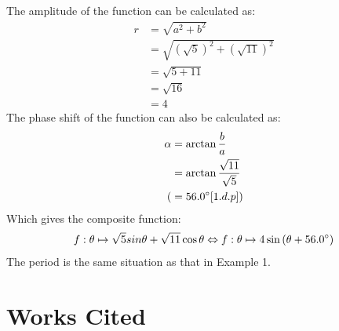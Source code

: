 \documentclass{article}
\begin{document}
        The amplitude of the function can be calculated as:
        \begin{align*}
        r &= \sqrt{a^2 + b^2} \\
        &= \sqrt{(\sqrt{5})^2 + (\sqrt{11})^2} \\
        &= \sqrt{5 + 11} \\
        &= \sqrt{16} \\
        &= 4
        \end{align*}
        The phase shift of the function can also be calculated as:
        \begin{align*}
        \alpha &= \arctan{\frac{b}{a}} \\
        &= \arctan{\frac{\sqrt{11}}{\sqrt{5}}} \\
        (&= 56.0\degree [1.d.p]) 
        \end{align*}
        Which gives the composite function:
        \begin{align*}
        f:\theta \mapsto \sqrt{5}sin{\theta} + \sqrt{11}\cos{\theta} \Leftrightarrow f:\theta \mapsto 4\sin{(\theta + 56.0\degree)}
        \end{align*}
        The period is the same situation as that in Example 1.
        \newpage
        \section{Works Cited}
        \printbibliography
\end{document}
